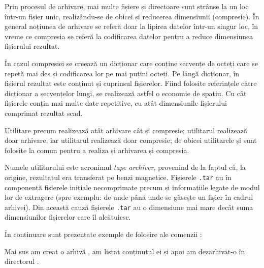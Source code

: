 Prin procesul de arhivare, mai multe fișiere și directoare sunt strânse la un
loc într-un fișier unic, realizându-se de obicei și reducerea dimensiunii (compresie). În general noțiunea de arhivare se referă doar la lipirea datelor într-un singur loc, în vreme ce compresia se referă la codificarea datelor pentru a reduce dimensiunea fișierului rezultat.

În cazul compresiei se creează un dicționar care conține secvențe de octeți care se
repetă mai des și codificarea lor pe mai puțini octeți. Pe lângă dicționar, în
fișierul rezultat este conținut și cuprinsul fișierelor. Fiind folosite referințele către
dicționar a secvențelor lungi, se realizează astfel o economie de spațiu. Cu cât
fișierele conțin mai multe date repetitive, cu atât dimensiunile fișierului comprimat rezultat scad.

Utilitare precum  realizează atât arhivare cât și compresie; utilitarul  realizează doar arhivare, iar utilitarul  realizează doar compresie; de obicei utilitarele  și  sunt folosite la comun pentru a realiza și arhivarea și compresia.

Numele utilitarului  este acronimul \textit{tape archiver}, provenind de la faptul că, la origine, rezultatul era
transferat pe benzi magnetice. Fișierele \texttt{.tar} au în componență fișierele
inițiale necomprimate precum și informațiile legate de modul lor de extragere
(spre exemplu: de unde până unde se găsește un fișier în cadrul arhivei). Din
această cauză fișierele \texttt{.tar} au o dimensiune mai mare decât suma dimensiunilor
fișierelor care îl alcătuiesc.

În continuare sunt prezentate exemple de folosire ale comenzii :


Mai sus am creat o arhivă , am listat conținutul ei și apoi am dezarhivat-o în directorul .

